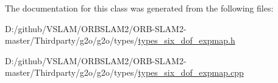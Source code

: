 The documentation for this class was generated from the following files\+:\begin{DoxyCompactItemize}
\item 
D\+:/github/\+V\+S\+L\+A\+M/\+O\+R\+B\+S\+L\+A\+M2/\+O\+R\+B-\/\+S\+L\+A\+M2-\/master/\+Thirdparty/g2o/g2o/types/\mbox{\hyperlink{types__six__dof__expmap_8h}{types\+\_\+six\+\_\+dof\+\_\+expmap.\+h}}\item 
D\+:/github/\+V\+S\+L\+A\+M/\+O\+R\+B\+S\+L\+A\+M2/\+O\+R\+B-\/\+S\+L\+A\+M2-\/master/\+Thirdparty/g2o/g2o/types/\mbox{\hyperlink{types__six__dof__expmap_8cpp}{types\+\_\+six\+\_\+dof\+\_\+expmap.\+cpp}}\end{DoxyCompactItemize}
